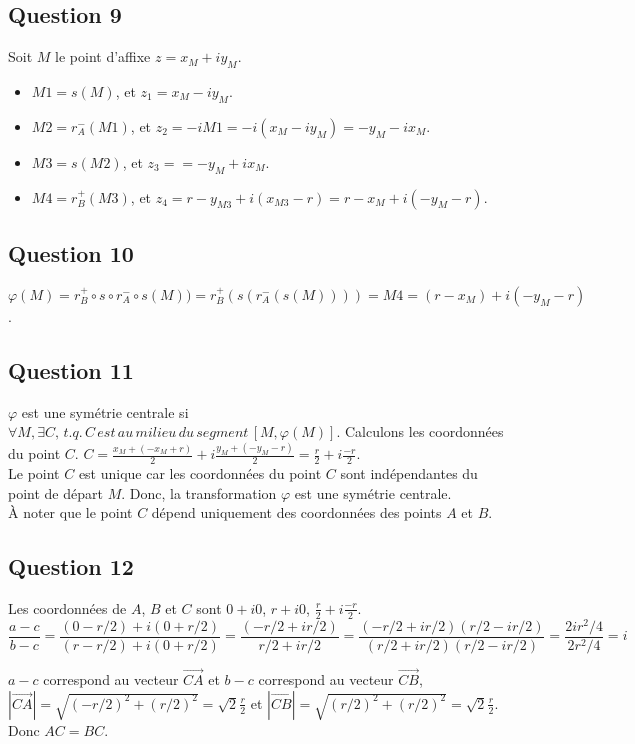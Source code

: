 \documentclass[]{book}
\theoremstyle{definition}
\begin{document}
\subsection*{Question 9}
Soit $M$ le point d'affixe $z=x_M + i y_M$. 
\begin{itemize}
\item $M1 = s(M)$, et $z_1 = x_M -i y_M$. 
\item $M2 = r_{A}^{-}(M1)$, et $z_2 = -iM1 = -i(x_M -i y_M) = -y_M - i x_M$. 
\item $M3 = s(M2)$, et $z_3 = = -y_M + i x_M$.
\item $M4 = r_{B}^{+}(M3)$, et $z_4 = r-y_{M3} + i(x_{M3} -r) = r-x_M + i(-y_M-r)$.  
\end{itemize}
 
\subsection*{Question 10}
$\varphi(M) = r_{B}^{+} \circ s \circ r_{A}^{-} \circ s(M)) = r_{B}^{+}(s(r_{A}^{-}(s(M)))) = M4 = (r-x_M) + i(-y_M-r)$.


\subsection*{Question 11}
$\varphi$ est une sym\'etrie centrale si $\forall M, \exists C,\, t.q.\, C\,est\,au\,milieu\,du\,segment\,[M,\varphi(M)]$. Calculons les coordonn\'ees du point $C$. $C = \frac{x_M + (-x_M + r)}{2} + i\frac{y_M + (-y_M - r)}{2} = \frac{r}{2} + i\frac{-r}{2}$.\\
Le point $C$ est unique car les coordonn\'ees du point $C$ sont ind\'ependantes du point de d\'epart $M$. 
Donc, la transformation $\varphi$ est une sym\'etrie centrale. \\
\`A noter que le point $C$ d\'epend uniquement des coordonn\'ees des points $A$ et $B$.

\subsection*{Question 12}
Les coordonn\'ees de $A$, $B$ et $C$ sont $0+i0$, $r+i0$, $\frac{r}{2} + i\frac{-r}{2}$.
$$\frac{a-c}{b-c} = \frac{(0-r/2)+i(0+r/2)}{(r-r/2)+i(0+r/2)} = \frac{(-r/2+ir/2)}{r/2+ir/2} = \frac{(-r/2+ir/2)(r/2-ir/2)}{(r/2+ir/2)(r/2-ir/2)} = \frac{2ir^2/4}{2r^2/4} = i$$


$a-c$ correspond au vecteur $\overrightarrow{CA}$ et $b-c$ correspond au vecteur $\overrightarrow{CB}$, $|\overrightarrow{CA}| = \sqrt{(-r/2)^2+(r/2)^2} = \sqrt{2}\frac{r}{2}$ et $|\overrightarrow{CB}| = \sqrt{(r/2)^2+(r/2)^2} = \sqrt{2}\frac{r}{2}$. Donc $AC=BC$.\\
\end{document}

